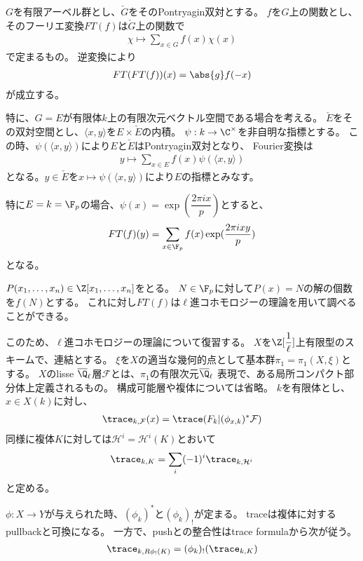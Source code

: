 \documentclass[uplatex, a4paper]{jsbook}
\begin{document}
$G$を有限アーベル群とし、$\check{G}$をそのPontryagin双対とする。
$f$を$G$上の関数とし、そのフーリエ変換$FT(f)$は$\check{G}$上の関数で
\begin{align*}
  \chi\mapsto\sum_{x\in G}f(x)\chi(x)
\end{align*}
で定まるもの。
逆変換により
\begin{align*}
  FT(FT(f))(x)=\abs{g}f(-x)
\end{align*}
が成立する。

特に、$G=E$が有限体$k$上の有限次元ベクトル空間である場合を考える。
$\check{E}$をその双対空間とし、$\langle x,y\rangle$を$E\times\check{E}$の内積。
$\psi:k \to \C^\times$を非自明な指標とする。
この時、$\psi(\langle x,y\rangle)$により$E$と$\check{E}$はPontryagin双対となり、
Fourier変換は
\begin{align*}
  y\mapsto\sum_{x\in E}f(x)\psi(\langle x,y\rangle)
\end{align*}
となる。$y\in\check{E}$を$x\mapsto \psi(\langle x,y\rangle)$により$E$の指標とみなす。

特に$E=k=\F_p$の場合、$\psi(x)=\exp(\dfrac{2\pi ix}{p})$とすると、
\begin{align*}
  FT(f)(y)=\sum_{x\in\F_p}f(x)\exp(\frac{2\pi ixy}{p})
\end{align*}
となる。

$P(x_1,\ldots,x_n)\in\Z[x_1,\ldots,x_n]$をとる。
$N\in\F_p$に対して$P(x)=N$の解の個数を$f(N)$とする。
これに対し$FT(f)$は$\ell$進コホモロジーの理論を用いて調べることができる。

このため、$\ell$進コホモロジーの理論について復習する。
$X$を$\Z[\dfrac{1}{\ell}]$上有限型のスキームで、連結とする。
$\xi$を$X$の適当な幾何的点として基本群$\pi_1=\pi_1(X,\xi)$とする。
$X$のlisse $\overline{\Q}_\ell$層$\mathcal{F}$とは、$\pi_1$の有限次元$\overline{\Q}_\ell$
表現で、ある局所コンパクト部分体上定義されるもの。
構成可能層や複体については省略。
$k$を有限体とし、$x\in X(k)$に対し、
\begin{align*}
  \trace_{k,\mathcal{F}}(x)=\trace(F_k\vert(\phi_{x,k})^*\mathcal{F})
\end{align*}
同様に複体$K$に対しては$\mathcal{H}^i=\mathcal{H}^i(K)$とおいて
\begin{align*}
  \trace_{k,K}=\sum_i(-1)^i\trace_{k,\mathcal{H}^i}
\end{align*}
と定める。

$\phi:X \to Y$が与えられた時、$(\phi_k)^*$と$(\phi_k)_!$が定まる。
traceは複体に対するpullbackと可換になる。
一方で、pushとの整合性はtrace formulaから次が従う。
\begin{align*}
  \trace_{k,R\phi_!(K)}=(\phi_k)_!(\trace_{k,K})
\end{align*}
\end{document}
